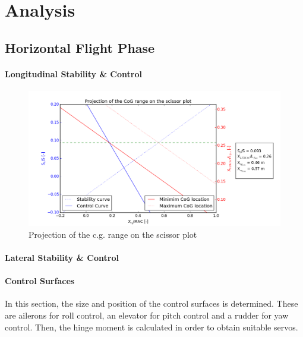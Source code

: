 \section{Analysis}

\subsection{Horizontal Flight Phase}



\paragraph{Longitudinal Stability \& Control}



\begin{figure}[htb]
    \centering
    \includegraphics[width=\textwidth]{StabilityandControl/Figures/ScissorVScg3}
    \caption{Projection of the c.g. range on the scissor plot}
    \label{fig:scissor}
\end{figure}

\paragraph{Lateral Stability \& Control}

\paragraph{Control Surfaces}

In this section, the size and position of the control surfaces is determined. These are ailerons for roll control, an elevator for pitch control and a rudder for yaw control. Then, the hinge moment is calculated in order to obtain suitable servos. 

